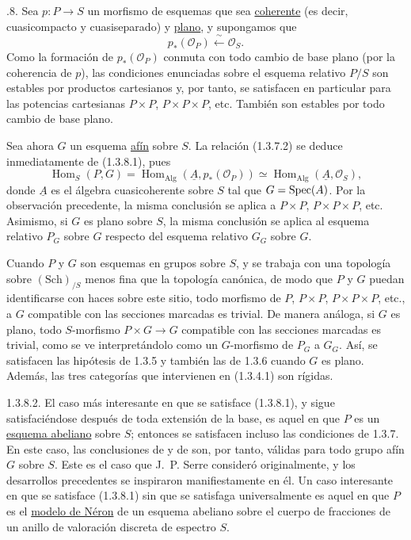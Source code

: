 \par\medskip{}.8. Sea $p:P\longrightarrow S$ un morfismo de esquemas que sea
\underline{coherente} (es decir, cuasicompacto y cuasiseparado) y
\underline{plano}, y supongamos que
\begin{equation}\tag{1.3.8.1}
 p_*(\mathcal O_P)\xleftarrow{\ \sim\ }\mathcal O_S.
\end{equation}
Como la formación de $p_*(\mathcal O_P)$ conmuta con todo cambio de
base plano (por la coherencia de $p$), las condiciones enunciadas
sobre el esquema relativo $P/S$ son estables por productos cartesianos
y, por tanto, se satisfacen en particular para las potencias
cartesianas $P\times P$, $P\times P\times P$, etc. También son
estables por todo cambio de base plano.

Sea ahora $G$ un esquema \underline{afín} sobre $S$. La relación
(1.3.7.2) se deduce inmediatamente de (1.3.8.1), pues
\[
 \operatorname{Hom}_S(P,G)
 =\operatorname{Hom}_{\mathrm{Alg}}(\underline A,p_*(\mathcal O_P))
 \simeq\operatorname{Hom}_{\mathrm{Alg}}(\underline A,\mathcal O_S),
\]
donde $\underline A$ es el álgebra cuasicoherente sobre $S$ tal que
$G=\operatorname{Spec}(\sisi{A}{\underline A})$. Por la observación
precedente, la misma conclusión se aplica a $P\times P$,
$P\times P\times P$, etc. Asimismo, si $G$ es plano sobre $S$, la
misma conclusión se aplica al esquema relativo $P_G$ sobre $G$
respecto del esquema relativo $G_G$ sobre $G$.

Cuando $P$ y $G$ son esquemas en grupos sobre $S$, y se trabaja con
una topología sobre $(\mathrm{Sch})_{/S}$ menos fina que la topología
canónica, de modo que $P$ y $G$ puedan identificarse con haces sobre
este sitio, todo morfismo de $P$, $P\times P$,
$P\times P\times P$, etc., a $G$ compatible con las secciones
marcadas es trivial. De manera análoga, si $G$ es plano, todo
$S$-morfismo $P\times G\longrightarrow G$ compatible con las secciones
marcadas es trivial, como se ve interpretándolo como un $G$-morfismo
de $P_G$ a $G_G$. Así, se satisfacen las hipótesis de 1.3.5 y también
las de 1.3.6 cuando $G$ es plano. Además, las tres categorías que
intervienen en (1.3.4.1) son rígidas.


1.3.8.2. El caso más interesante en que se satisface (1.3.8.1), y
sigue satisfaciéndose después de toda extensión de la base, es aquel
en que $P$ es un \underline{esquema abeliano} sobre $S$; entonces se
satisfacen incluso las condiciones de 1.3.7. En este caso, las
conclusiones de  y de  son, por
tanto, válidas para todo grupo afín $G$ sobre $S$. Este es el caso que
J.~P. Serre consideró originalmente, y los desarrollos precedentes se
inspiraron manifiestamente en él. Un caso interesante en que se
satisface (1.3.8.1) sin que se satisfaga universalmente es aquel en que
$P$ es el \underline{modelo de Néron} de un esquema abeliano sobre el
cuerpo de fracciones de un anillo de valoración discreta de espectro
$S$.
